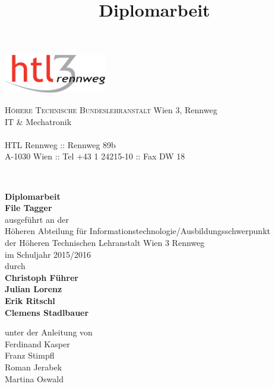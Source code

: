 \documentclass[12pt,a4paper,english,oneside,openright,DIV=12,BCOR=1cm]{scrbook}
\begin{document}
\title{Diplomarbeit}
\begin{titlepage}
\begin{minipage}[b]{1\columnwidth}
\parbox[b]{50mm}{\includegraphics[width=45mm]{images/htl3r-logo}}
\hfill
\parbox[b]{130mm}{\footnotesize \textsc{Höhere Technische Bundeslehranstalt} Wien 3, Rennweg\\
IT \& Mechatronik\\
\\
HTL Rennweg :: Rennweg 89b\\
A-1030 Wien :: Tel +43 1 24215-10 :: Fax DW 18
}\\
\mbox{}
\end{minipage}

\vspace{1cm}


\begin{center}
\textbf{\LARGE{}Diplomarbeit}{\large{}}\\
{\large{}\vspace{15mm}
 }
\textbf{\large{}File Tagger}\\
 \vspace{15mm}
 ausgeführt an der\\
 Höheren Abteilung für Informationstechnologie/Ausbildungsschwerpunkt\\
 der Höheren Technischen Lehranstalt Wien 3 Rennweg\\
 \vspace{1cm}
 im Schuljahr 2015/2016\\
 \vspace{1cm}
 durch\\
 \vspace{0.5cm}
\textbf{\large{}Christoph Führer}\\
\textbf{\large{}Julian Lorenz}\\
\textbf{\large{}Erik Ritschl}\\
\textbf{\large{}Clemens Stadlbauer}\\

\par\end{center}{\large \par}

\begin{center}
\vspace{20mm}
 \normalsize unter der Anleitung von\\
 \vspace{0.5cm}
 Ferdinand Kasper\\
Franz Stimpfl\\
Roman Jerabek\\
Martina Oswald \\
\par\end{center}


\end{titlepage}
\end{document}
